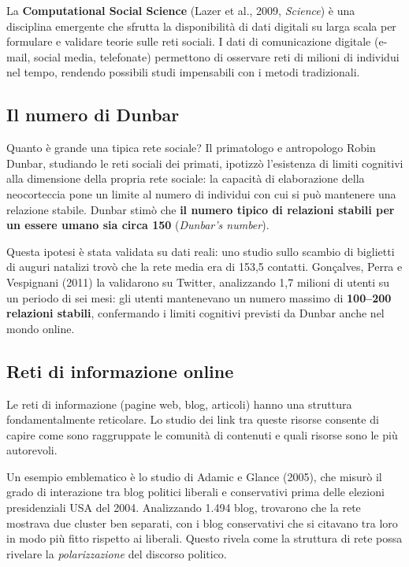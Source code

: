 \documentclass[12pt,a4paper]{article}
\begin{document}
La \textbf{Computational Social Science} (Lazer et al., 2009, \textit{Science}) è una
disciplina emergente che sfrutta la disponibilità di dati digitali su larga scala per
formulare e validare teorie sulle reti sociali. I dati di comunicazione digitale (e-mail,
social media, telefonate) permettono di osservare reti di milioni di individui nel tempo,
rendendo possibili studi impensabili con i metodi tradizionali.

\subsection{Il numero di Dunbar}

Quanto è grande una tipica rete sociale? Il primatologo e antropologo Robin Dunbar, studiando
le reti sociali dei primati, ipotizzò l'esistenza di limiti cognitivi alla dimensione della
propria rete sociale: la capacità di elaborazione della neocorteccia pone un limite al numero
di individui con cui si può mantenere una relazione stabile. Dunbar stimò che
\textbf{il numero tipico di relazioni stabili per un essere umano sia circa 150}
(\emph{Dunbar's number}).

Questa ipotesi è stata validata su dati reali: uno studio sullo scambio di biglietti di
auguri natalizi trovò che la rete media era di 153,5 contatti. Gonçalves, Perra e Vespignani
(2011) la validarono su Twitter, analizzando 1,7 milioni di utenti su un periodo di sei mesi:
gli utenti mantenevano un numero massimo di \textbf{100--200 relazioni stabili}, confermando
i limiti cognitivi previsti da Dunbar anche nel mondo online.

\subsection{Reti di informazione online}

Le reti di informazione (pagine web, blog, articoli) hanno una struttura fondamentalmente
reticolare. Lo studio dei link tra queste risorse consente di capire come sono raggruppate
le comunità di contenuti e quali risorse sono le più autorevoli.

Un esempio emblematico è lo studio di Adamic e Glance (2005), che misurò il grado di
interazione tra blog politici liberali e conservativi prima delle elezioni presidenziali USA
del 2004. Analizzando 1.494 blog, trovarono che la rete mostrava due cluster ben separati,
con i blog conservativi che si citavano tra loro in modo più fitto rispetto ai liberali.
Questo rivela come la struttura di rete possa rivelare la \emph{polarizzazione} del
discorso politico.
\end{document}
